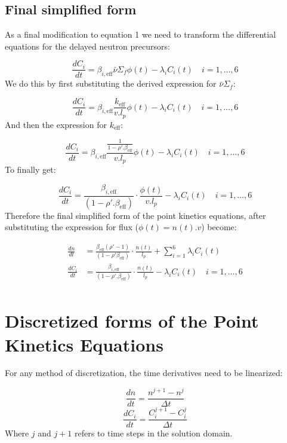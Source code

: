\documentclass[11pt,letterpaper,titlepage]{article}
\begin{document}
\subsection{Final simplified form}
As a final modification to equation 1 we need to transform the differential equations for the delayed neutron precursors:

$$
	\frac{dC_i}{dt} = \beta_{i,\mathrm{eff}}\bar{\nu} \Sigma_f \phi (t) - \lambda_i C_i (t) \quad i=1,\dots,6
$$
\noindent
We do this by first substituting the derived expression for $\bar{\nu} \Sigma_f $:

$$
	\frac{dC_i}{dt} = \beta_{i,\mathrm{eff}}\frac{k_{\mathrm{eff}}}{v.l_p} \phi (t) - \lambda_i C_i (t) \quad i=1,\dots,6
$$
\noindent
And then the expression for $k_{\mathrm{eff}}$:

$$
\frac{dC_i}{dt} = \beta_{i,\mathrm{eff}}\frac{\frac{1}{1-\rho'.\beta_{\mathrm{eff}}}}{v.l_p} \phi (t) - \lambda_i C_i (t) \quad i=1,\dots,6
$$
\noindent
To finally get:

$$
	\frac{dC_i}{dt} = \frac{\beta_{i,\mathrm{eff}}}{(1-\rho'.\beta_{\mathrm{eff}})}  \cdot   \frac{\phi (t)}{v.l_p}  - \lambda_i C_i (t) \quad i=1,\dots,6
$$
\noindent
Therefore the final simplified form of the point kinetics equations, after substituting the expression for flux ($\phi(t)=n(t).v$) become:

\begin{equation}
\begin{aligned}
\frac{dn}{dt}&= \frac{\beta_{\mathrm{eff}}(\rho'-1)}{(1-\rho'\beta_{\mathrm{eff}})}\cdot \frac{n(t)}{l_p}  + \sum_{i=1}^6 \lambda_i C_i (t) \\
\frac{dC_i}{dt} &= \frac{\beta_{i,\mathrm{eff}}}{(1-\rho'.\beta_{\mathrm{eff}})}  \cdot   \frac{n (t)}{l_p}  - \lambda_i C_i (t) \quad i=1,\dots,6 \\
\end{aligned}
\end{equation}

\newpage
{}
\section{Discretized forms of the Point Kinetics Equations}
For any method of discretization, the time derivatives need to be linearized:

$$
	\frac{dn}{dt}=\frac{n^{j+1}-n^j}{\Delta t}
$$
$$
	\frac{dC_i}{dt}=\frac{C_i^{j+1}-C_i^j}{\Delta t}
$$
\newline
\noindent
Where $j$ and $j+1$ refers to time steps in the solution domain.
\end{document}
